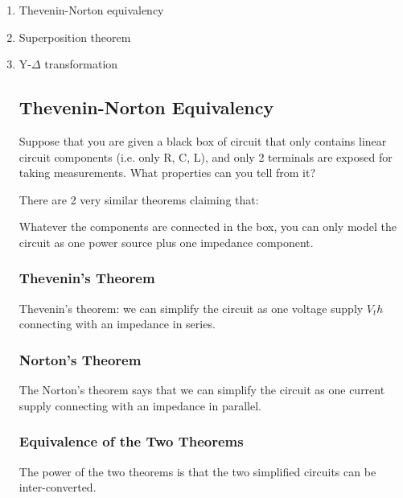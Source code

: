\documentclass[class=article, crop=false, 12pt]{standalone}
\begin{document}
\begin{enumerate}
    \item Thevenin-Norton equivalency
    \item Superposition theorem
    \item Y-$\Delta$ transformation

\subsection{Thevenin-Norton Equivalency}

Suppose that you are given a black box of circuit that only contains linear circuit components 
(i.e. only R, C, L), and only 2 terminals are exposed for taking measurements.
What properties can you tell from it?


There are 2 very similar theorems claiming that:

Whatever the components are connected in the box, you can only model the circuit 
as one power source plus one impedance component. 

\subsubsection{Thevenin's Theorem}

Thevenin's theorem: we can simplify the circuit as one voltage supply $V_th$ connecting with
an impedance in series.



\subsubsection{Norton's Theorem}

The Norton's theorem says that we can simplify the circuit as one current supply connecting with 
an impedance in parallel.



\subsubsection{Equivalence of the Two Theorems}

The power of the two theorems is that the two simplified circuits can be inter-converted. 



\end{enumerate}
\end{document}
